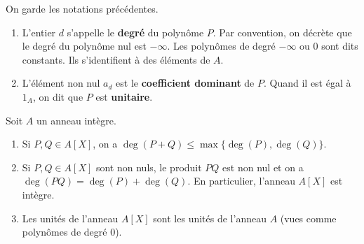 \documentclass[]{report}
\begin{document}
\begin{df}{}{}
    On garde les notations précédentes.
    \begin{enumerate}
        \item L'entier $d$ s'appelle le \textbf{degré} du polynôme $P$. Par convention, on décrète que le degré du polynôme nul est $-\infty$. Les polynômes de degré $-\infty$ ou $0$ sont dits constants. Ils s'identifient à des éléments de $A$.
        \item L'élément non nul $a_d$ est le \textbf{coefficient dominant} de $P$. Quand il est égal à $1_A$, on dit que $P$ est \textbf{unitaire}.
    \end{enumerate}
\end{df}

\begin{prop}{}{}
    Soit $A$ un anneau intègre.
    \begin{enumerate}
        \item Si $P, Q \in A[X]$, on a $\deg(P + Q) \le \max\{\deg(P), \deg(Q)\}$.
        \item Si $P, Q \in A[X]$ sont non nuls, le produit $PQ$ est non nul et on a $\deg(PQ) = \deg(P) + \deg(Q)$. En particulier, l'anneau $A[X]$ est intègre.
        \item Les unités de l'anneau $A[X]$ sont les unités de l'anneau $A$ (vues comme polynômes de degré $0$).
    \end{enumerate}
\end{prop}
\end{document}
